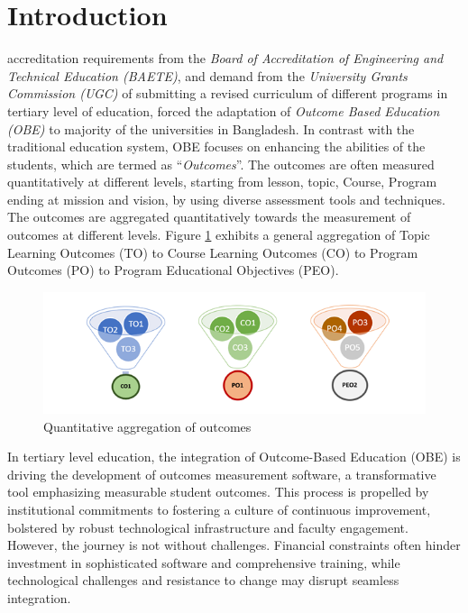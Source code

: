 \documentclass[journal,onecolumn]{IEEEtran}
\begin{document}
\section{\textbf{Introduction}}
% 
% 
% 
% 
 accreditation requirements from the \textit{Board of Accreditation of Engineering and Technical Education (BAETE)}, and demand from the \textit{University Grants Commission (UGC)} of submitting a revised curriculum of different programs in tertiary level of education, forced the adaptation of \textit{Outcome Based Education (OBE)} to majority of the universities in Bangladesh. In contrast with the traditional education system, OBE focuses on enhancing the abilities of the students, which are termed as “\textit{Outcomes}”. The outcomes are often measured quantitatively at different levels, starting from lesson, topic, Course, Program ending at mission and vision, by using diverse assessment tools and techniques. The outcomes are aggregated quantitatively towards the measurement of outcomes at different levels. Figure \ref{fig:quntitative} exhibits a general aggregation of Topic Learning Outcomes (TO) to Course Learning Outcomes (CO) to Program Outcomes (PO) to Program Educational Objectives (PEO).

\begin{figure}
    \centering
    \includegraphics[width=1\linewidth]{img/Picture1.png}
    \caption{Quantitative aggregation of outcomes}
    \label{fig:quntitative}
\end{figure}


In tertiary level education, the integration of Outcome-Based Education (OBE) is driving the development of outcomes measurement software, a transformative tool emphasizing measurable student outcomes. This process is propelled by institutional commitments to fostering a culture of continuous improvement, bolstered by robust technological infrastructure and faculty engagement. However, the journey is not without challenges. Financial constraints often hinder investment in sophisticated software and comprehensive training, while technological challenges and resistance to change may disrupt seamless integration.  
\end{document}
